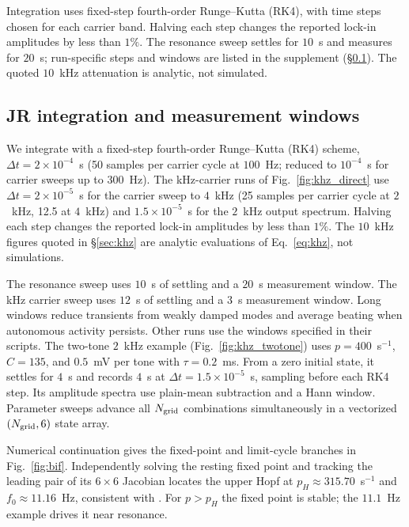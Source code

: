 \documentclass[11pt,a4paper]{article}
\newif\ifjne
\providecommand{\DIFaddtex}[1]{{\protect\color{blue} \sf #1}} %
\providecommand{\DIFaddbegin}{} %
\providecommand{\DIFaddend}{} %
\providecommand{\DIFadd}[1]{\texorpdfstring{\DIFaddtex{#1}}{#1}} %
\begin{document}
Integration uses fixed-step fourth-order Runge--Kutta (RK4), with time steps
chosen for each carrier band. Halving each step changes the reported lock-in
amplitudes by less than $1\%$. The resonance sweep settles for $10$~s and measures
for $20$~s; run-specific steps and windows are listed in the supplement
(\S\ref{supp:jr-runs}). The quoted $10$~kHz attenuation is analytic, not simulated.
\ifjne\else
\subsection{JR integration and measurement windows}\label{supp:jr-runs}
We integrate with a fixed-step fourth-order Runge--Kutta (RK4) scheme,
$\Delta t=2\times10^{-4}$~s (50 samples per carrier cycle at $100$~Hz; reduced to
$10^{-4}$~s for carrier sweeps up to $300$~Hz). The kHz-carrier runs of
Fig.~\ref{fig:khz_direct} use $\Delta t=2\times10^{-5}$~s for the carrier sweep to
$4$~kHz (25 samples per carrier cycle at $2$~kHz, 12.5 at $4$~kHz) and
$1.5\times10^{-5}$~s for the $2$~kHz output spectrum. Halving each step changes the
reported lock-in amplitudes by less than $1\%$. The $10$~kHz figures quoted in
\S\ref{sec:khz} are analytic evaluations of Eq.~\eqref{eq:khz}, not simulations.

The resonance sweep uses $10$~s of settling and a $20$~s
measurement window. \DIFaddbegin \DIFadd{The kHz carrier sweep uses $12$~s of settling and
a $3$~s measurement window. }\DIFaddend Long windows reduce transients from weakly damped modes and
average beating when autonomous activity persists. Other runs use the windows
specified in their scripts.
The two-tone $2$~kHz example (Fig.~\ref{fig:khz_twotone}) uses $p=400$~s$^{-1}$,
$C=135$, and $0.5$~mV per tone with $\tau=0.2$~ms. From a zero initial state,
it settles for $4$~s and records $4$~s at $\Delta t=1.5\times10^{-5}$~s,
sampling before each RK4 step. Its amplitude spectra use plain-mean subtraction
and a Hann window. Parameter sweeps advance all $N_{\rm grid}$ combinations simultaneously
in a vectorized $(N_{\rm grid},6)$ state array.

\fi

Numerical continuation gives the fixed-point and limit-cycle branches in
Fig.~\ref{fig:bif}. Independently solving the resting fixed point and tracking
the leading pair of its $6\times6$ Jacobian locates the upper Hopf at
$p_H\approx315.70$~s$^{-1}$ and $f_0\approx11.16$~Hz, consistent with
\cite{grimbert2006}. For $p>p_H$ the fixed point is stable; the $11.1$~Hz
example drives it near resonance.
\end{document}
